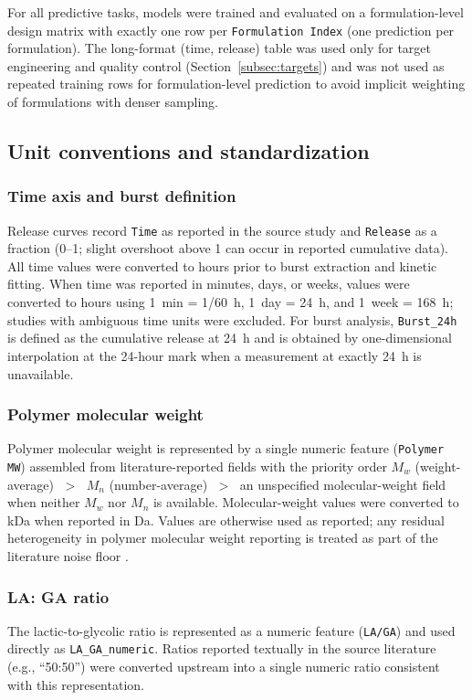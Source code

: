 \documentclass[preprint,12pt,authoryear]{elsarticle}
\begin{document}
For all predictive tasks, models were trained and evaluated on a formulation-level design matrix with exactly one row per \texttt{Formulation Index} (one prediction per formulation). The long-format (time, release) table was used only for target engineering and quality control (Section~\ref{subsec:targets}) and was not used as repeated training rows for formulation-level prediction to avoid implicit weighting of formulations with denser sampling.

\subsection{Unit conventions and standardization}
\label{subsec:units}
\subsubsection{Time axis and burst definition}
Release curves record \texttt{Time} as reported in the source study and \texttt{Release} as a fraction (0--1; slight overshoot above 1 can occur in reported cumulative data). All time values were converted to hours prior to burst extraction and kinetic fitting. When time was reported in minutes, days, or weeks, values were converted to hours using 1~min = 1/60~h, 1~day = 24~h, and 1~week = 168~h; studies with ambiguous time units were excluded. For burst analysis, \texttt{Burst\_24h} is defined as the cumulative release at 24~h and is obtained by one-dimensional interpolation at the 24-hour mark when a measurement at exactly 24~h is unavailable.

\subsubsection{Polymer molecular weight}
Polymer molecular weight is represented by a single numeric feature (\texttt{Polymer MW}) assembled from literature-reported fields with the priority order $M_w$ (weight-average) $\;>\;$ $M_n$ (number-average) $\;>\;$ an unspecified molecular-weight field when neither $M_w$ nor $M_n$ is available. Molecular-weight values were converted to kDa when reported in Da. Values are otherwise used as reported; any residual heterogeneity in polymer molecular weight reporting is treated as part of the literature noise floor \citep{Fredenberg2011, MakadiaSiegel2011, Jain2000}.

\subsubsection{LA: GA ratio}
The lactic-to-glycolic ratio is represented as a numeric feature (\texttt{LA/GA}) and used directly as \texttt{LA\_GA\_numeric}. Ratios reported textually in the source literature (e.g., ``50:50'') were converted upstream into a single numeric ratio consistent with this representation.
\end{document}
